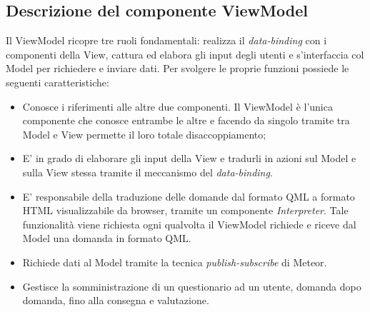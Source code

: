 	\subsection{Descrizione del componente ViewModel}
	Il ViewModel ricopre tre ruoli fondamentali: realizza il \emph{data-binding} con i componenti della View, cattura ed elabora gli input degli utenti e s'interfaccia col Model per richiedere e inviare dati. Per svolgere le proprie funzioni possiede le seguenti caratteristiche:
	\begin{itemize}
		\item Conosce i riferimenti alle altre due componenti. Il ViewModel è l'unica componente che conosce entrambe le altre e facendo da singolo tramite tra Model e View permette il loro totale disaccoppiamento;
		\item E' in grado di elaborare gli input della View e tradurli in azioni sul Model e sulla View stessa tramite il meccanismo del \emph{data-binding}.  
		\item E' responsabile della traduzione delle domande dal formato QML a formato HTML visualizzabile da browser, tramite un componente \emph{Interpreter}.  Tale funzionalità viene richiesta ogni qualvolta il ViewModel richiede e riceve dal Model una domanda in formato QML.
		\item Richiede dati al Model tramite la tecnica \emph{publish-subscribe} di Meteor.
		\item Gestisce la somministrazione di un questionario ad un utente, domanda dopo domanda, fino alla consegna e valutazione.
	\end{itemize}
	\newpage